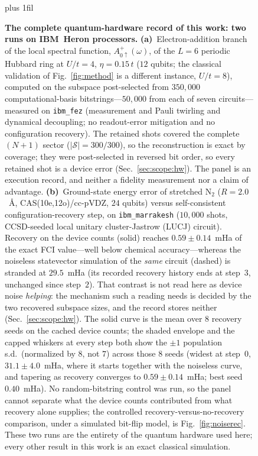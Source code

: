 \begin{figure}[tp]\centering
\leftskip=-34.6pt plus 1fil\relax

\caption{\textbf{The complete quantum-hardware record of this work: two runs on IBM~Heron processors.}
\textbf{(a)}~Electron-addition branch of the local spectral function, $A^{+}_{0\uparrow}(\omega)$, of the
$L=6$ periodic Hubbard ring at $U/t=4$,
$\eta=0.15\,t$ ($12$ qubits; the classical validation of Fig.~\ref{fig:method} is a different instance,
$U/t=8$), computed on the subspace post-selected from $350{,}000$ computational-basis bitstrings---$50{,}000$ from each of seven
circuits---measured on \texttt{ibm\_fez} (measurement and Pauli
twirling and dynamical decoupling; no readout-error mitigation and no configuration recovery). The retained shots
covered the complete $(N{+}1)$ sector ($|\mathcal S|\!=\!300/300$), so the reconstruction is exact by
coverage; they were post-selected in reversed bit order, so every retained shot is a device error
(Sec.~\ref{sec:scope:hw}). The panel is an execution record, and neither a fidelity measurement nor a
claim of advantage.
\textbf{(b)}~Ground-state energy error of stretched $\mathrm{N_2}$ ($R=2.0$~\AA, CAS(10e,12o)/cc-pVDZ,
$24$ qubits) versus self-consistent configuration-recovery step, on \texttt{ibm\_marrakesh} ($10{,}000$ shots,
CCSD-seeded local unitary cluster-Jastrow (LUCJ) circuit). Recovery on the device counts (solid) reaches
$0.59\pm0.14$~mHa of the exact FCI value---well below chemical accuracy---whereas the noiseless statevector
simulation of the \emph{same} circuit (dashed) is stranded at $29.5$~mHa (its recorded recovery history
ends at step~$3$, unchanged since step~$2$). That contrast is not read here as device noise \emph{helping}: the
mechanism such a reading needs is decided by the two recovered subspace sizes, and the record
stores neither (Sec.~\ref{sec:scope:hw}). The
solid curve is the mean over $8$ recovery seeds on the cached device counts; the shaded envelope and the
capped whiskers at every step both show the $\pm1$ population s.d.\ (normalized by $8$, not $7$) across those $8$ seeds (widest at
step~$0$, $31.1\pm4.0$~mHa, where it starts together with the noiseless curve, and tapering as recovery
converges to $0.59\pm0.14$~mHa; best seed $0.40$~mHa). No random-bitstring control was run, so the
panel cannot separate what the device counts contributed from what recovery alone supplies; the
controlled recovery-versus-no-recovery comparison, under a simulated bit-flip model, is
Fig.~\ref{fig:noiserec}. These two runs are the entirety of the quantum
hardware used here; every other result in this work is an exact classical simulation.}\label{fig:heron}\end{figure}
